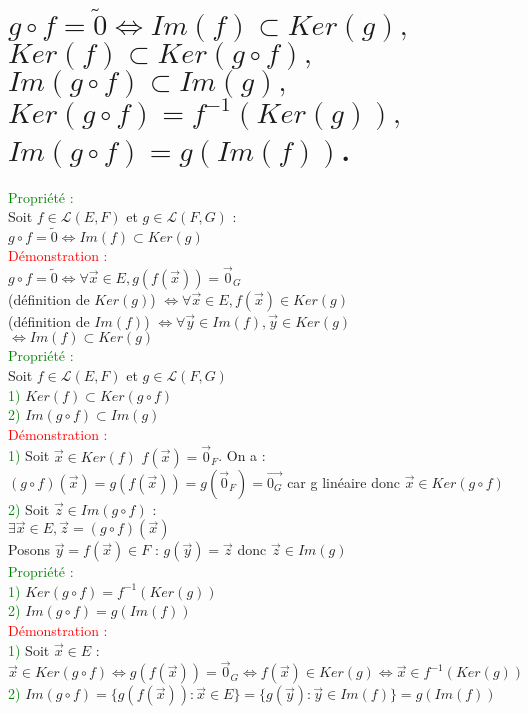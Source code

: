 \documentclass{article}
\begin{document}
\section{$g \circ f = \tilde{0} \Leftrightarrow Im(f) \subset Ker(g),$ $Ker(f) \subset Ker (g \circ f),$ $Im(g \circ f) \subset Im(g),$ $Ker(g \circ f)=f^{-1}(Ker(g)),$ $Im(g \circ f)=g(Im (f))$.}
\textcolor{green}{Propriété :} \\ 
Soit $f \in \mathcal{L}(E,F)$ et $g \in \mathcal{L}(F,G)$ : \\ 
$g \circ f = \tilde{0} \Leftrightarrow Im(f) \subset Ker(g)$ \\ 
\textcolor{red}{Démonstration :} \\ 
$g\circ f = \tilde{0} \Leftrightarrow \forall \vec{x} \in E, g(f(\vec{x}))=\vec{0}_G$ \\ 
(définition de $Ker(g)$) $\Leftrightarrow \forall \vec{x} \in E, f(\vec{x}) \in Ker(g)$ \\ 
(définition de $Im(f)$) $\Leftrightarrow \forall \vec{y} \in Im(f), \vec{y} \in Ker(g)$ \\ 
$\Leftrightarrow Im(f) \subset Ker(g)$ \\ 
\textcolor{green}{Propriété :}\\ 
Soit $f \in \mathcal{L}(E,F)$ et $g \in \mathcal{L}(F,G)$ \\ 
\textcolor{green}{1)} $Ker(f) \subset Ker (g \circ f)$ \\ 
\textcolor{green}{2)} $Im(g \circ f) \subset Im(g)$ \\ 
\textcolor{red}{Démonstration :} \\ 
\textcolor{green}{1)} Soit $\vec{x} \in Ker(f)$ $f(\vec{x})=\vec{0}_F$. On a : \\ 
$(g \circ f)(\vec{x})=g(f(\vec{x}))=g(\vec{0}_F)= \vec{0_G}$ car g linéaire donc $\vec{x} \in Ker(g \circ f)$ \\ 
\textcolor{green}{2)} Soit $\vec{z} \in  Im(g \circ f)$ : \\ 
$\exists \vec{x} \in E, \vec{z}= (g \circ f)(\vec{x})$ \\ 
Posons $\vec{y}=f(\vec{x}) \in F$ : $g(\vec{y})=\vec{z}$ donc $\vec{z} \in Im(g)$ \\ 
\textcolor{green}{Propriété :} \\ 
\textcolor{green}{1)} $Ker(g\circ f)= f^{-1}(Ker(g))$ \\ 
\textcolor{green}{2)} $Im(g \circ f)=g(Im(f))$ \\ 
\textcolor{red}{Démonstration :} \\ 
\textcolor{green}{1)} Soit $ \vec{x} \in E$ : \\ 
$\vec{x} \in Ker(g \circ f) \Leftrightarrow g(f(\vec{x}))=\vec{0}_G \Leftrightarrow f(\vec{x}) \in Ker(g) \Leftrightarrow \vec{x} \in f^{-1}(Ker(g))$ \\ 
\textcolor{green}{2)} $Im(g \circ f)= \lbrace g(f(\vec{x})) : \vec{x} \in E \rbrace= \lbrace g(\vec{y}): \vec{y} \in Im(f) \rbrace = g(Im(f))$ \\ 
\end{document}
